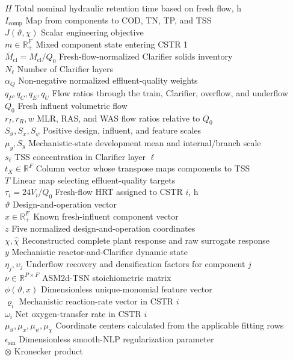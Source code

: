 \documentclass[a4paper,fleqn]{cas-sc}
\newcommand{\R}{\mathbb{R}}
\begin{document}
\begin{tabbing}
$H$ \> Total nominal hydraulic retention time based on fresh flow, h \\
$I_{\mathrm{comp}}$ \> Map from components to COD, TN, TP, and TSS \\
$J(\vartheta,\chi)$ \> Scalar engineering objective \\
$m\in\R_+^F$ \> Mixed component state entering CSTR 1 \\
$\overline M_{\mathrm{cl}}=M_{\mathrm{cl}}/Q_0$ \> Fresh-flow-normalized Clarifier solids inventory \\
$N_\ell$ \> Number of Clarifier layers \\
$\alpha_Q$ \> Non-negative normalized effluent-quality weights \\
$q_P,q_C,q_E,q_U$ \> Flow ratios through the train, Clarifier, overflow, and underflow \\
$Q_0$ \> Fresh influent volumetric flow \\
$r_I,r_R,w$ \> MLR, RAS, and WAS flow ratios relative to $Q_0$ \\
$S_\vartheta,S_x,S_\psi$ \> Positive design, influent, and feature scales \\
$\mu_y,S_y$ \> Mechanistic-state development mean and internal/branch scale \\
$s_\ell$ \> TSS concentration in Clarifier layer $\ell$ \\
$t_X\in\R^F$ \> Column vector whose transpose maps components to TSS \\
$T$ \> Linear map selecting effluent-quality targets \\
$\tau_i=24V_i/Q_0$ \> Fresh-flow HRT assigned to CSTR $i$, h \\
$\vartheta$ \> Design-and-operation vector \\
$x\in\R_+^F$ \> Known fresh-influent component vector \\
$z$ \> Five normalized design-and-operation coordinates \\
$\chi,\widehat\chi$ \> Reconstructed complete plant response and raw surrogate response \\
$y$ \> Mechanistic reactor-and-Clarifier dynamic state \\
$\eta_j,\upsilon_j$ \> Underflow recovery and densification factors for component $j$ \\
$\nu\in\R^{P\times F}$ \> ASM2d-TSN stoichiometric matrix \\
$\phi(\vartheta,x)$ \> Dimensionless unique-monomial feature vector \\
$\varrho_i$ \> Mechanistic reaction-rate vector in CSTR $i$ \\
$\omega_i$ \> Net oxygen-transfer rate in CSTR $i$ \\
$\mu_\vartheta,\mu_x,\mu_\psi,\mu_\chi$ \> Coordinate centers calculated from the applicable fitting rows \\
$\epsilon_{\mathrm{sm}}$ \> Dimensionless smooth-NLP regularization parameter \\
$\otimes$ \> Kronecker product \\
\end{tabbing}
\end{document}
